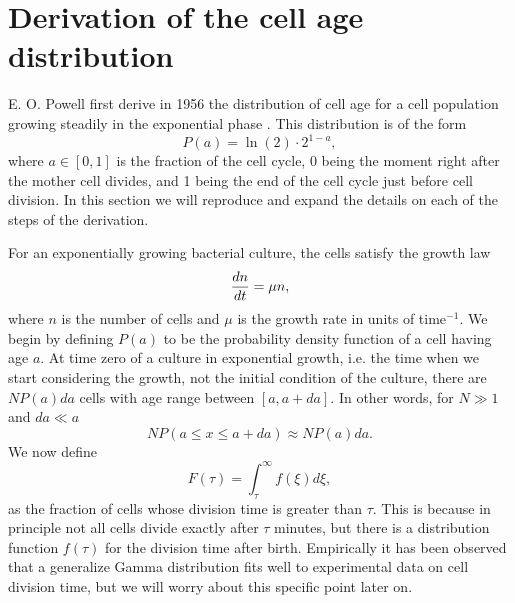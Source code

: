 \section{Derivation of the cell age distribution}
\label{supp_cell_age_dist}

E. O. Powell first derive in 1956 the distribution of cell age for a cell
population growing steadily in the exponential phase \cite{Powell1956}. This
distribution is of the form
\begin{equation}
  P(a) = \ln(2) \cdot 2^{1 - a},
\end{equation}
where $a \in [0, 1]$ is the fraction of the cell cycle, 0 being the moment right
after the mother cell divides, and 1 being the end of the cell cycle just before
cell division. In this section we will reproduce and expand the details on each
of the steps of the derivation.

For an exponentially growing bacterial culture, the cells satisfy the growth law
\begin{equation}
  {{d{n} \over dt}} = \mu n,
  \label{seq_growth_ode}
\end{equation}
where $n$ is the number of cells and $\mu$ is the growth rate in units of
time$^{-1}$. We begin by defining $P(a)$ to be the probability density function
of a cell having age $a$. At time zero of a culture in exponential growth, i.e.
the time when we start considering the growth, not the initial condition of the
culture, there are $NP(a)da$ cells with age range between $[a, a + da]$. In
other words, for $N \gg 1$ and $da \ll a$
\begin{equation}
  N P(a \leq x \leq a + da) \approx N P(a)da.
\end{equation}
We now define
\begin{equation}
  F(\tau) = \int_\tau^\infty f(\xi) d\xi,
\end{equation}
as the fraction of cells whose division time is greater than $\tau$. This is
because in principle not all cells divide exactly after $\tau$ minutes, but
there is a distribution function $f(\tau)$ for the division time after birth.
Empirically it has been observed that a generalize Gamma distribution fits well
to experimental data on cell division time, but we will worry about this
specific point later on.


